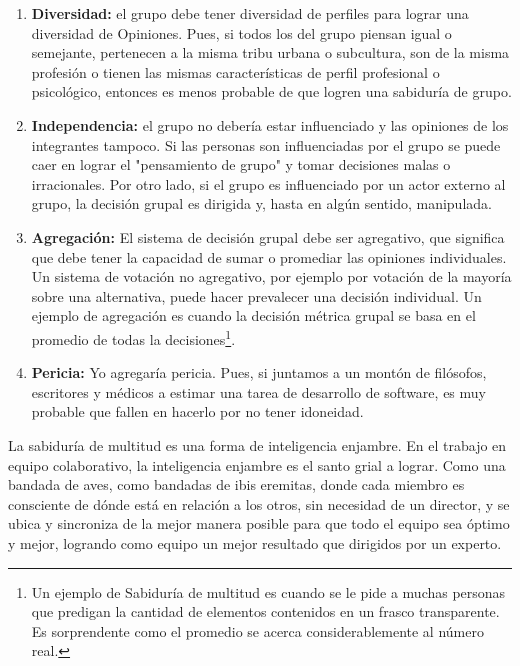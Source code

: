 \begin{enumerate}

\item \textbf{Diversidad:} el grupo debe tener diversidad de perfiles para lograr una diversidad de Opiniones. Pues, si todos los del grupo piensan igual o semejante, pertenecen a la misma tribu urbana o subcultura, son de la misma profesión o tienen las mismas características de perfil profesional o psicológico, entonces es menos probable de que logren una sabiduría de grupo.

\item \textbf{Independencia:} el grupo no debería estar influenciado y las opiniones de los integrantes tampoco. Si las personas son influenciadas por el grupo se puede caer en lograr el "pensamiento de grupo" y tomar decisiones malas o irracionales. Por otro lado, si el grupo es influenciado por un actor externo al grupo, la decisión grupal es dirigida y, hasta en algún sentido, manipulada.

\item \textbf{Agregación:} El sistema de decisión grupal debe ser agregativo, que significa que debe tener la capacidad de sumar o promediar las opiniones individuales. Un sistema de votación no agregativo, por ejemplo por votación de la mayoría sobre una alternativa, puede hacer prevalecer una decisión individual. Un ejemplo de agregación es cuando la decisión métrica grupal se basa en el promedio de todas la decisiones\footnote{Un ejemplo de Sabiduría de multitud es cuando se le pide a muchas personas que predigan la cantidad de elementos contenidos en un frasco transparente. Es sorprendente como el promedio se acerca considerablemente al número real.}.

\item \textbf{Pericia:} Yo agregaría pericia. Pues, si juntamos a un montón de filósofos, escritores y médicos a estimar una tarea de desarrollo de software, es muy probable que fallen en hacerlo por no tener idoneidad.

\end{enumerate}

La sabiduría de multitud es una forma de inteligencia enjambre. En el trabajo en equipo colaborativo, la inteligencia enjambre es el santo grial a lograr. Como una bandada de aves, como bandadas de ibis eremitas, donde cada miembro es consciente de dónde está en relación a los otros, sin necesidad de un director, y se ubica y sincroniza de la mejor manera posible para que todo el equipo sea óptimo y mejor, logrando como equipo un mejor resultado que dirigidos por un experto.

